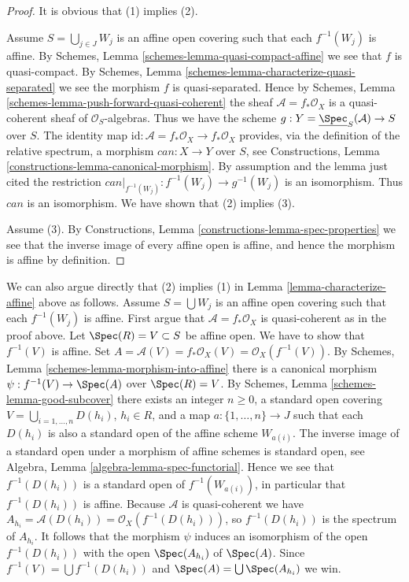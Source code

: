\begin{proof}
It is obvious that (1) implies (2).

\medskip\noindent
Assume $S = \bigcup_{j \in J} W_j$ is an affine open covering such that
each $f^{-1}(W_j)$ is affine. By
Schemes, Lemma \ref{schemes-lemma-quasi-compact-affine} we see
that $f$ is quasi-compact. By
Schemes, Lemma \ref{schemes-lemma-characterize-quasi-separated}
we see the morphism $f$ is quasi-separated. Hence by
Schemes, Lemma \ref{schemes-lemma-push-forward-quasi-coherent} the
sheaf $\mathcal{A} = f_*\mathcal{O}_X$ is a quasi-coherent sheaf
of $\mathcal{O}_S$-algebras. Thus we have the scheme
$g : Y = \underline{\Spec}_S(\mathcal{A}) \to S$ over $S$.
The identity map
$\text{id} : \mathcal{A} = f_*\mathcal{O}_X \to f_*\mathcal{O}_X$
provides, via the definition of the relative spectrum,
a morphism $can : X \to Y$ over $S$, see
Constructions, Lemma \ref{constructions-lemma-canonical-morphism}.
By assumption and the lemma just cited
the restriction $can|_{f^{-1}(W_j)} : f^{-1}(W_j) \to g^{-1}(W_j)$
is an isomorphism. Thus $can$ is an isomorphism.
We have shown that (2) implies (3).

\medskip\noindent
Assume (3). By Constructions, Lemma \ref{constructions-lemma-spec-properties}
we see that the inverse image of every affine open is affine, and hence
the morphism is affine by definition.
\end{proof}

\begin{remark}
\label{remark-direct-argument}
We can also argue directly that (2) implies (1) in
Lemma \ref{lemma-characterize-affine} above as follows.
Assume $S = \bigcup W_j$ is an affine open covering
such that each $f^{-1}(W_j)$ is affine.
First argue that $\mathcal{A} = f_*\mathcal{O}_X$ is quasi-coherent
as in the proof above.
Let $\Spec(R) = V \subset S$ be affine open.
We have to show that $f^{-1}(V)$ is affine. Set
$A = \mathcal{A}(V) = f_*\mathcal{O}_X(V) = \mathcal{O}_X(f^{-1}(V))$.
By Schemes, Lemma \ref{schemes-lemma-morphism-into-affine} there is
a canonical morphism $\psi : f^{-1}(V) \to \Spec(A)$ over
$\Spec(R) = V$.
By Schemes, Lemma \ref{schemes-lemma-good-subcover} there exists
an integer $n \geq 0$, a standard open covering
$V = \bigcup_{i = 1, \ldots, n} D(h_i)$, $h_i \in R$, and a map
$a : \{1, \ldots, n\} \to J$ such that each $D(h_i)$ is also
a standard open of the affine scheme $W_{a(i)}$. The inverse image
of a standard open under a morphism of affine schemes is standard open, see
Algebra, Lemma \ref{algebra-lemma-spec-functorial}. Hence we see
that $f^{-1}(D(h_i))$ is a standard open of $f^{-1}(W_{a(i)})$,
in particular that $f^{-1}(D(h_i))$ is affine. Because $\mathcal{A}$
is quasi-coherent we have
$A_{h_i} = \mathcal{A}(D(h_i)) = \mathcal{O}_X(f^{-1}(D(h_i)))$,
so $f^{-1}(D(h_i))$ is the spectrum of $A_{h_i}$.
It follows that the morphism $\psi$ induces an isomorphism of the open
$f^{-1}(D(h_i))$ with the open $\Spec(A_{h_i})$ of
$\Spec(A)$. Since $f^{-1}(V) = \bigcup f^{-1}(D(h_i))$
and $\Spec(A) = \bigcup \Spec(A_{h_i})$ we win.
\end{remark}


